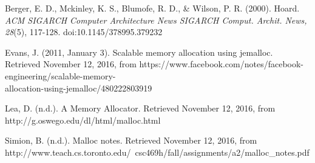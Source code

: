 \documentclass[11pt,twoside]{article}
\begin{document}
\begin{thebibliography}{4}

Berger, E. D., Mckinley, K. S., Blumofe, R. D., & Wilson, P. R. (2000). Hoard. \textit{ACM SIGARCH Computer Architecture News SIGARCH Comput. Archit. News, 28}(5), 117-128. doi:10.1145/378995.379232

Evans, J. (2011, January 3). Scalable memory allocation using jemalloc. Retrieved November 12, 2016, from https://www.facebook.com/notes/facebook-engineering/scalable-memory-\\allocation-using-jemalloc/480222803919

Lea, D. (n.d.). A Memory Allocator. Retrieved November 12, 2016, from http://g.oswego.edu/dl/html/malloc.html

Simion, B. (n.d.). Malloc notes. Retrieved November 12, 2016, from http://www.teach.cs.toronto.edu/~csc469h/fall/assignments/a2/malloc\_notes.pdf

\end{thebibliography}
\end{document}

